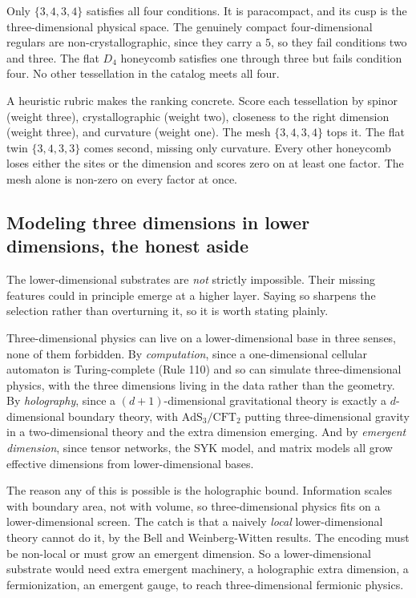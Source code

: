 \begin{theorem}
Only $\{3,4,3,4\}$ satisfies all four conditions. It is paracompact, and its cusp is the three-dimensional physical space. The genuinely compact four-dimensional regulars are non-crystallographic, since they carry a $5$, so they fail conditions two and three. The flat $D_4$ honeycomb satisfies one through three but fails condition four. No other tessellation in the catalog meets all four.
\end{theorem}

A heuristic rubric makes the ranking concrete. Score each tessellation by spinor (weight three), crystallographic (weight two), closeness to the right dimension (weight three), and curvature (weight one). The mesh $\{3,4,3,4\}$ tops it. The flat twin $\{3,4,3,3\}$ comes second, missing only curvature. Every other honeycomb loses either the sites or the dimension and scores zero on at least one factor. The mesh alone is non-zero on every factor at once.

\subsection{Modeling three dimensions in lower dimensions, the honest aside}

The lower-dimensional substrates are \emph{not} strictly impossible. Their missing features could in principle emerge at a higher layer. Saying so sharpens the selection rather than overturning it, so it is worth stating plainly.

Three-dimensional physics can live on a lower-dimensional base in three senses, none of them forbidden. By \emph{computation}, since a one-dimensional cellular automaton is Turing-complete (Rule 110) and so can simulate three-dimensional physics, with the three dimensions living in the data rather than the geometry. By \emph{holography}, since a $(d{+}1)$-dimensional gravitational theory is exactly a $d$-dimensional boundary theory, with $\mathrm{AdS}_3/\mathrm{CFT}_2$ putting three-dimensional gravity in a two-dimensional theory and the extra dimension emerging. And by \emph{emergent dimension}, since tensor networks, the SYK model, and matrix models all grow effective dimensions from lower-dimensional bases.

The reason any of this is possible is the holographic bound. Information scales with boundary area, not with volume, so three-dimensional physics fits on a lower-dimensional screen. The catch is that a naively \emph{local} lower-dimensional theory cannot do it, by the Bell and Weinberg-Witten results. The encoding must be non-local or must grow an emergent dimension. So a lower-dimensional substrate would need extra emergent machinery, a holographic extra dimension, a fermionization, an emergent gauge, to reach three-dimensional fermionic physics.

